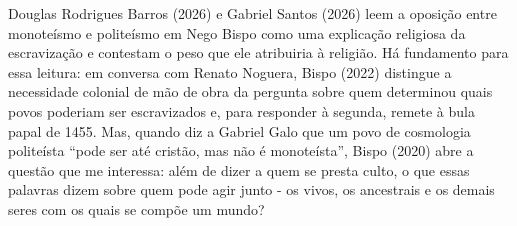 Douglas Rodrigues Barros (2026) e Gabriel Santos (2026) leem a oposição entre monoteísmo e politeísmo em Nego Bispo como uma explicação religiosa da escravização e contestam o peso que ele atribuiria à religião. Há fundamento para essa leitura: em conversa com Renato Noguera, Bispo (2022) distingue a necessidade colonial de mão de obra da pergunta sobre quem determinou quais povos poderiam ser escravizados e, para responder à segunda, remete à bula papal de 1455. Mas, quando diz a Gabriel Galo que um povo de cosmologia politeísta \enquote{pode ser até cristão, mas não é monoteísta}, Bispo (2020) abre a questão que me interessa: além de dizer a quem se presta culto, o que essas palavras dizem sobre quem pode agir junto - os vivos, os ancestrais e os demais seres com os quais se compõe um mundo?